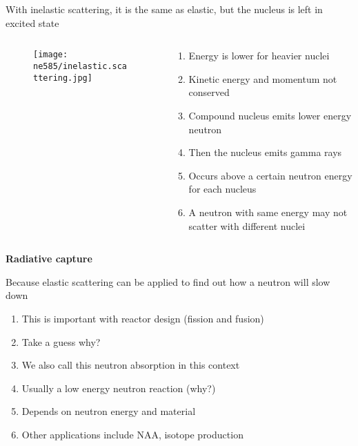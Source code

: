 \documentclass[aspectratio=1610,pdftex,dvipsnames,compress,xcolor={dvipsnames}]{beamer}
\begin{document}
\addtocounter{framenumber}{-1} 
\begin{frame}{With inelastic scattering, it is the same as elastic, but the nucleus is left in excited state}
    \begin{columns}[t]

        \begin{column}{0.50\textwidth}
            \begin{figure}
                \centering
                \texttt{[image: ne585/inelastic.scattering.jpg]}
            \end{figure}
        \end{column}

        \begin{column}{0.50\textwidth}
            \begin{enumerate}[series=outerlist,topsep=0pt,itemsep=12pt,leftmargin=*,label=(\arabic*)]
                \item[]Energy is lower for heavier nuclei
                \item[]Kinetic energy and momentum not conserved
                \item[]Compound nucleus emits lower energy neutron
                \item[]Then the nucleus emits gamma rays
                \item[]Occurs above a certain neutron energy for each nucleus
                \item[]A neutron with same energy may not scatter with different nuclei
            \end{enumerate}
        \end{column}

    \end{columns}
\end{frame}


\begin{frame}[plain]{}
    \centering\LARGE\textbf{Radiative capture}
\end{frame}


\addtocounter{framenumber}{-1} 
\begin{frame}{Because elastic scattering can be applied to find out how a neutron will slow down}
    \begin{enumerate}[series=outerlist,topsep=0pt,itemsep=21pt,leftmargin=*,label=(\arabic*)]
        \item[]This is important with reactor design (fission and fusion)
        \item[]Take a guess why?
        \item[]We also call this neutron absorption in this context
        \item[]Usually a low energy neutron reaction (why?)
        \item[]Depends on neutron energy and material
        \item[]Other applications include NAA, isotope production
    \end{enumerate}
\end{frame}
\end{document}
